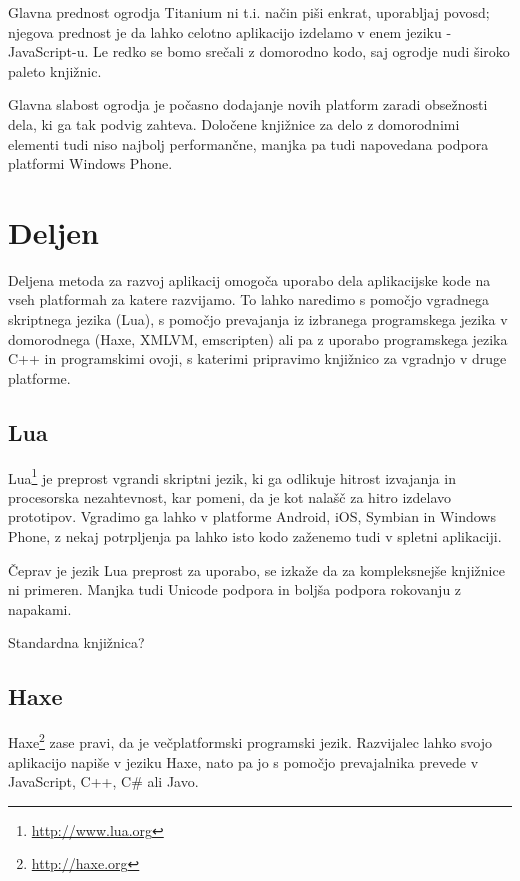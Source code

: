 Glavna prednost ogrodja Titanium ni t.i. način piši enkrat, uporabljaj povosd; njegova prednost je da lahko celotno aplikacijo izdelamo v enem jeziku - JavaScript-u. Le redko se bomo srečali z domorodno kodo, saj ogrodje nudi široko paleto knjižnic.

Glavna slabost ogrodja je počasno dodajanje novih platform zaradi obsežnosti dela, ki ga tak podvig zahteva. Določene knjižnice za delo z domorodnimi elementi tudi niso najbolj performančne, manjka pa tudi napovedana podpora platformi Windows Phone.

\section{Deljen}

Deljena metoda za razvoj aplikacij omogoča uporabo dela aplikacijske kode na vseh platformah za katere razvijamo. To lahko naredimo s pomočjo vgradnega skriptnega jezika (Lua), s pomočjo prevajanja iz izbranega programskega jezika v domorodnega (Haxe, XMLVM, emscripten) ali pa z uporabo programskega jezika C++ in programskimi ovoji, s katerimi pripravimo knjižnico za vgradnjo v druge platforme.

\subsection{Lua}

Lua\footnote{\href{http://www.lua.org}{http://www.lua.org}} je preprost vgrandi skriptni jezik, ki ga odlikuje hitrost izvajanja in procesorska nezahtevnost, kar pomeni, da je kot nalašč za hitro izdelavo prototipov. Vgradimo ga lahko v platforme Android, iOS, Symbian in Windows Phone, z nekaj potrpljenja pa lahko isto kodo zaženemo tudi v spletni aplikaciji.

Čeprav je jezik Lua preprost za uporabo, se izkaže da za kompleksnejše knjižnice ni primeren. Manjka tudi Unicode podpora in boljša podpora rokovanju z napakami.

Standardna knjižnica?

\subsection{Haxe}

Haxe\footnote{\href{http://haxe.org}{http://haxe.org}} zase pravi, da je večplatformski programski jezik. Razvijalec lahko svojo aplikacijo napiše v jeziku Haxe, nato pa jo s pomočjo prevajalnika prevede v JavaScript, C++, C\# ali Javo.

